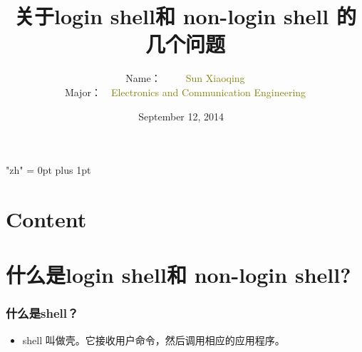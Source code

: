 \documentclass[notheorems,mathserif,table,compress,10pt]{beamer}  %
\begin{document}
\XeTeXlinebreaklocale "zh"         %
\XeTeXlinebreakskip = 0pt plus 1pt %


\title{关于login shell和 non-login shell 的几个问题 }
\author[OUC]{Name：~~~~~\textcolor{olive}{Sun Xiaoqing}\\
    \quad Major：~~\textcolor{olive}{Electronics and Communication Engineering}}
\date{September 12, 2014 ~}
\frame{ \titlepage }
\section*{Content}



\section{什么是login shell和 non-login shell?}

\begin{frame}
\frametitle{什么是shell？}
\begin{itemize}
\item shell 叫做壳。它接收用户命令，然后调用相应的应用程序。
\end{itemize}
\end{frame}  
\end{document}

